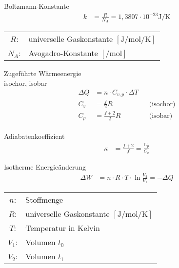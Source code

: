 \begin{karte}{Boltzmann-Konstante}
    \begin{align*}
        k &= \frac{R}{N_A} = 1,3807 \cdot 10^{-23} \si{\joule\per\kelvin}
    \end{align*}
    \begin{tabular}[t]{cl}
        \( R \): & universelle Gaskonstante \([ \si{\joule\per\mol\per\kelvin} ] \)\\
        \( N_A \): & Avogadro-Konstante \([ \si{\per\mol} ] \)\\
    \end{tabular}
\end{karte}

\begin{karte}{Zugeführte Wärmeenergie\\isochor, isobar}
    \begin{align*}
        \Delta Q &= n \cdot C_{v,p} \cdot \Delta T \\
        C_v &= \tfrac{f}{2} R && \text{(isochor)} \\
        C_p &= \tfrac{f+2}{2} R && \text{(isobar)} \\
    \end{align*}
\end{karte}

\begin{karte}{Adiabatenkoeffizient}
    \begin{align*}
        \kappa &= \frac{f+2}{f} = \frac{C_p}{C_v}
    \end{align*}
\end{karte}

\begin{karte}{Isotherme Energieänderung}
    \begin{align*}
        \Delta W &= n \cdot R \cdot T \cdot \ln \frac{V_2}{V_1} = - \Delta Q
    \end{align*}
    \begin{tabular}[t]{cl}
        \( n \): & Stoffmenge \\
        \( R \): & universelle Gaskonstante \([ \si{\joule\per\mol\per\kelvin} ] \)\\
        \( T \): & Temperatur in Kelvin\\
        \( V_1 \): & Volumen \(t_0\)\\
        \( V_2 \): & Volumen \(t_1\)\\
    \end{tabular}
\end{karte}

